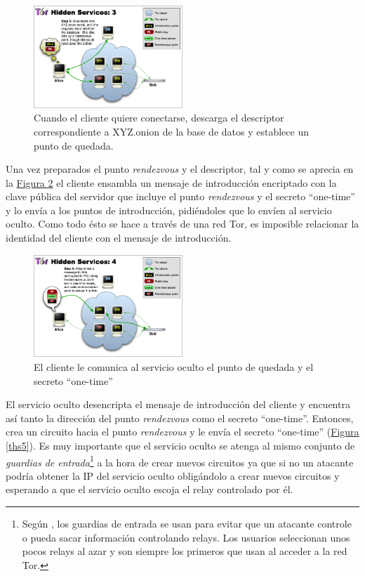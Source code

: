 \documentclass[10pt,a4paper,spanish]{article}
\begin{document}
\begin{figure}[!h]
    \centering
    \includegraphics[width=0.5\textwidth]{THS-3}
    \caption{Cuando el cliente quiere conectarse, descarga el descriptor correspondiente a XYZ.onion de la base de datos y establece un punto de quedada.}
    \label{ths3}
\end{figure}

Una vez preparados el punto \textit{rendezvous} y el descriptor, tal y como se aprecia en la \hyperref[ths4]{Figura \ref*{ths4}} el cliente ensambla un mensaje de introducción encriptado con la clave pública del servidor que incluye el punto \textit{rendezvous} y el secreto ``one-time'' y lo envía a los puntos de introducción, pidiéndoles que lo envíen al servicio oculto. Como todo ésto se hace a través de una red Tor, es imposible relacionar la identidad del cliente con el mensaje de introducción.

\begin{figure}[!h]
    \centering
    \includegraphics[width=0.5\textwidth]{THS-4}
    \caption{El cliente le comunica al servicio oculto el punto de quedada y el secreto ``one-time''}
    \label{ths4}
\end{figure}

El servicio oculto desencripta el mensaje de introducción del cliente y encuentra así tanto la dirección del punto \textit{rendezvous} como el secreto ``one-time''. Entonces, crea un circuito hacia el punto \textit{rendezvous} y le envía el secreto ``one-time'' (\hyperref[ths5]{Figura \ref*{ths5}}). Es muy importante que el servicio oculto se atenga al mismo conjunto de \textit{guardias de entrada}\footnote{Según \cite{entryguards}, los guardias de entrada se usan para evitar que un atacante controle o pueda sacar información controlando relays. Los usuarios seleccionan unos pocos relays al azar y son siempre los primeros que usan al acceder a la red Tor.} a la hora de crear nuevos circuitos ya que si no un atacante podría obtener la IP del servicio oculto obligándolo a crear nuevos circuitos y esperando a que el servicio oculto escoja el relay controlado por él.
\end{document}
